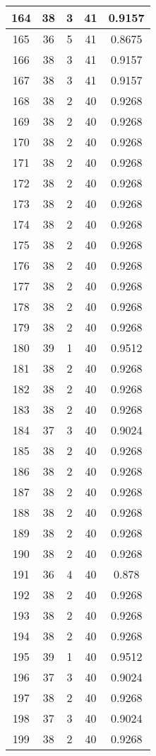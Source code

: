 \documentclass[letterpaper, 12pt]{article}
\begin{document}
\begin{longtable}{|c|c|c|c|c|}
\hline
164 & 38 & 3 & 41 & 0.9157 \\
\hline
165 & 36 & 5 & 41 & 0.8675 \\
\hline
166 & 38 & 3 & 41 & 0.9157 \\
\hline
167 & 38 & 3 & 41 & 0.9157 \\
\hline
168 & 38 & 2 & 40 & 0.9268 \\
\hline
169 & 38 & 2 & 40 & 0.9268 \\
\hline
170 & 38 & 2 & 40 & 0.9268 \\
\hline
171 & 38 & 2 & 40 & 0.9268 \\
\hline
172 & 38 & 2 & 40 & 0.9268 \\
\hline
173 & 38 & 2 & 40 & 0.9268 \\
\hline
174 & 38 & 2 & 40 & 0.9268 \\
\hline
175 & 38 & 2 & 40 & 0.9268 \\
\hline
176 & 38 & 2 & 40 & 0.9268 \\
\hline
177 & 38 & 2 & 40 & 0.9268 \\
\hline
178 & 38 & 2 & 40 & 0.9268 \\
\hline
179 & 38 & 2 & 40 & 0.9268 \\
\hline
180 & 39 & 1 & 40 & 0.9512 \\
\hline
181 & 38 & 2 & 40 & 0.9268 \\
\hline
182 & 38 & 2 & 40 & 0.9268 \\
\hline
183 & 38 & 2 & 40 & 0.9268 \\
\hline
184 & 37 & 3 & 40 & 0.9024 \\
\hline
185 & 38 & 2 & 40 & 0.9268 \\
\hline
186 & 38 & 2 & 40 & 0.9268 \\
\hline
187 & 38 & 2 & 40 & 0.9268 \\
\hline
188 & 38 & 2 & 40 & 0.9268 \\
\hline
189 & 38 & 2 & 40 & 0.9268 \\
\hline
190 & 38 & 2 & 40 & 0.9268 \\
\hline
191 & 36 & 4 & 40 & 0.878 \\
\hline
192 & 38 & 2 & 40 & 0.9268 \\
\hline
193 & 38 & 2 & 40 & 0.9268 \\
\hline
194 & 38 & 2 & 40 & 0.9268 \\
\hline
195 & 39 & 1 & 40 & 0.9512 \\
\hline
196 & 37 & 3 & 40 & 0.9024 \\
\hline
197 & 38 & 2 & 40 & 0.9268 \\
\hline
198 & 37 & 3 & 40 & 0.9024 \\
\hline
199 & 38 & 2 & 40 & 0.9268 \\
\hline
\end{longtable}
\end{document}
